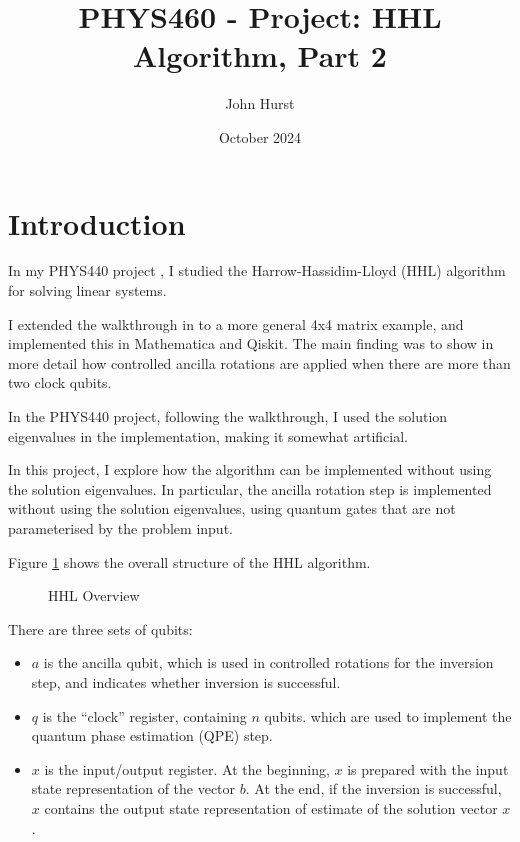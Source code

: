 \documentclass[12pt]{extarticle}
\title{PHYS460 - Project: HHL Algorithm, Part 2}
\author{John Hurst}
\date{October 2024}
\begin{document}
\maketitle

\tableofcontents

\newpage

\section{Introduction}

In my PHYS440 project \cite{github_project_hhl}, I studied the Harrow-Hassidim-Lloyd (HHL) algorithm for solving linear systems.

I extended the walkthrough in \cite{zaman2023step} to a more general 4x4 matrix example, and implemented this in Mathematica and Qiskit.
The main finding was to show in more detail how controlled ancilla rotations are applied when there are more than two clock qubits.

In the PHYS440 project, following the walkthrough, I used the solution eigenvalues in the implementation,
making it somewhat artificial.

In this project, I explore how the algorithm can be implemented without using the solution eigenvalues.
In particular, the ancilla rotation step is implemented without using the solution eigenvalues,
using quantum gates that are not parameterised by the problem input.

Figure \ref{fig:hhloverview} shows the overall structure of the HHL algorithm.
\begin{figure}[h]
    \centering
    \caption{HHL Overview}
    \label{fig:hhloverview}
\end{figure}

There are three sets of qubits:
\begin{itemize}
    \item $a$ is the ancilla qubit, which is used in controlled rotations for the inversion step, and indicates whether inversion is successful.
    \item $q$ is the ``clock'' register, containing $n$ qubits. which are used to implement the quantum phase estimation (QPE) step.
    \item $x$ is the input/output register. At the beginning, $x$ is prepared with the input state representation of the vector $b$. At the end, if the inversion is successful, $x$ contains the output state representation of estimate of the solution vector $x$.
\end{itemize}
\end{document}

